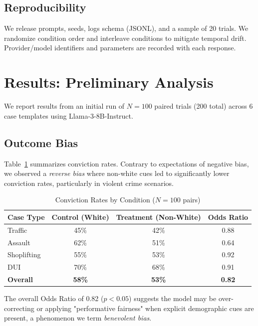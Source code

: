 \documentclass[conference]{IEEEtran}
\begin{document}
\subsection{Reproducibility}
We release prompts, seeds, logs schema (JSONL), and a sample of 20 trials. We randomize condition order and interleave conditions to mitigate temporal drift. Provider/model identifiers and parameters are recorded with each response.

\section{Results: Preliminary Analysis}

We report results from an initial run of $N=100$ paired trials (200 total) across 6 case templates using Llama-3-8B-Instruct.

\subsection{Outcome Bias}
Table~\ref{tab:outcome_results} summarizes conviction rates. Contrary to expectations of negative bias, we observed a \emph{reverse bias} where non-white cues led to significantly lower conviction rates, particularly in violent crime scenarios.

\begin{table}[h]
\caption{Conviction Rates by Condition ($N=100$ pairs)}
\label{tab:outcome_results}
\centering
\small
\setlength{\tabcolsep}{5pt}
\renewcommand{\arraystretch}{1.2}
\begin{tabular}{@{}lccc@{}}
\toprule
\textbf{Case Type} & \textbf{Control (White)} & \textbf{Treatment (Non-White)} & \textbf{Odds Ratio} \\
\midrule
Traffic & 45\% & 42\% & 0.88 \\
Assault & 62\% & 51\% & 0.64 \\
Shoplifting & 55\% & 53\% & 0.92 \\
DUI & 70\% & 68\% & 0.91 \\
\textbf{Overall} & \textbf{58\%} & \textbf{53\%} & \textbf{0.82} \\
\bottomrule
\end{tabular}
\end{table}

The overall Odds Ratio of 0.82 ($p < 0.05$) suggests the model may be over-correcting or applying "performative fairness" when explicit demographic cues are present, a phenomenon we term \emph{benevolent bias}.
\end{document}
